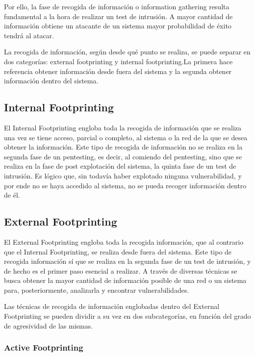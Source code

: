 Por ello, la fase de recogida de información o information gathering resulta fundamental a la hora de realizar un test de intrusión. A mayor cantidad de información obtiene un atacante de un sistema mayor probabilidad de éxito tendrá al atacar.

La recogida de información, según desde qué punto se realiza, se puede separar en dos categorías: external footprinting y internal footprinting.La primera hace referencia obtener información desde fuera del sistema y la segunda obtener información dentro del sistema.

\subsection{Internal Footprinting}

El Internal Footprinting engloba toda la recogida de información que se realiza una vez se tiene acceso, parcial o completo, al sistema o la red de la que se desea obtener la información. Este tipo de recogida de información no se realiza en la segunda fase de un pentesting, es decir, al comiendo del pentesting, sino que se realiza en la fase de post explotación del sistema, la quinta fase de un test de intrusión. Es lógico que, sin todavía haber explotado ninguna vulnerabilidad, y por ende no se haya accedido al sistema, no se pueda recoger información dentro de él.

\subsection{External Footprinting}

El External Footprinting engloba toda la recogida información, que al contrario que el Internal Footprinting, se realiza desde fuera del sistema. Este tipo de recogida información sí que se realiza en la segunda fase de un test de intrusión, y de hecho es el primer paso esencial a realizar. A través de diversas técnicas se busca obtener la mayor cantidad de información posible de una red o un sistema para, posteriormente, analizarla y encontrar vulnerabilidades.

Las técnicas de recogida de información englobadas dentro del External Footprinting se pueden dividir a su vez en dos subcategorías, en función del grado de agresividad de las mismas. 

\subsubsection{Active Footprinting}

